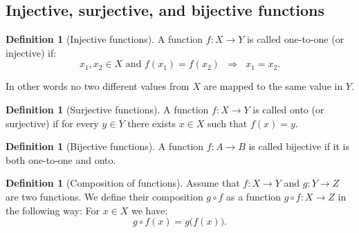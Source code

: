\documentclass[11pt]{article}
\theoremstyle{definition}
\newtheorem{defn}[thm]{Definition}
\theoremstyle{plain}
\begin{document}
\subsection{Injective, surjective, and bijective functions}

\begin{defn}[Injective functions]
A function \( f:X\to Y \) is called one-to-one (or injective) if: \[ x_1,x_2\in X\mbox{ and } f(x_1)=f(x_2) \;\;\Rightarrow \;\; x_1=x_2.\]
\end{defn}

In other words no two different values from \( X \) are mapped to the same value in \( Y \).

\begin{defn}[Surjective functions]
A function \( f:X\to Y \) is called onto (or surjective) if for every \( y\in Y \) there exists \( x\in X \) such that \( f(x)=y \).
\end{defn}
\begin{defn}[Bijective functions]
A function \( f:A\to B \) is called bijective if it is both one-to-one and onto.
\end{defn}

\begin{defn}[Composition of functions]
Assume that \( f:X\to Y \) and \( g:Y\to Z \) are two functions. We define their composition \( g\circ f \) as a function \( g\circ f:X\to Z \) in the following way: For \( x\in X \) we have: \[ g\circ f(x)= g\big(f(x)\big).\]
\end{defn}
\end{document}
